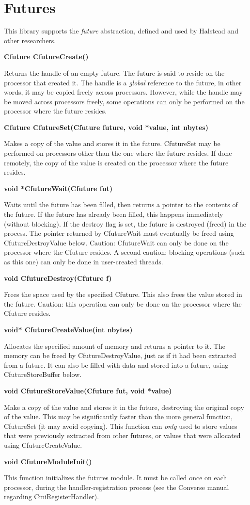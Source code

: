 \chapter{Futures}

This library supports the {\em future} abstraction, defined and used by
Halstead and other researchers.


{\bf Cfuture CfutureCreate()}

Returns the handle of an empty future.  The future is said to reside
on the processor that created it.  The handle is a {\em global}
reference to the future, in other words, it may be copied freely
across processors.  However, while the handle may be moved across
processors freely, some operations can only be performed on the
processor where the future resides.

{\bf Cfuture CfutureSet(Cfuture future, void *value, int nbytes)}

Makes a copy of the value and stores it in the future.  CfutureSet
may be performed on processors other than the one where the future
resides.  If done remotely, the copy of the value is created on the
processor where the future resides.

{\bf void *CfutureWait(Cfuture fut)}

Waits until the future has been filled, then returns a pointer to the
contents of the future.  If the future has already been filled, this
happens immediately (without blocking).  If the destroy flag is set,
the future is destroyed (freed) in the process.  The pointer returned
by CfutureWait must eventually be freed using CfutureDestroyValue
below.  Caution: CfutureWait can only be done on the processor where
the Cfuture resides.  A second caution: blocking operations (such as
this one) can only be done in user-created threads.

{\bf void CfutureDestroy(Cfuture f)}

Frees the space used by the specified Cfuture.  This also frees the
value stored in the future.  Caution: this operation can only be done
on the processor where the Cfuture resides.

{\bf void* CfutureCreateValue(int nbytes)}

Allocates the specified amount of memory and returns a pointer to it.
The memory can be freed by CfutureDestroyValue, just as if it had been
extracted from a future.  It can also be filled with data and stored
into a future, using CfutureStoreBuffer below.

{\bf void CfutureStoreValue(Cfuture fut, void *value)}

Make a copy of the value and stores it in the future, destroying the
original copy of the value.  This may be significantly faster than the
more general function, CfutureSet (it may avoid copying).  This
function can {\em only} used to store values that were previously
extracted from other futures, or values that were allocated using
CfutureCreateValue.

{\bf void CfutureModuleInit()}

This function initializes the futures module.  It must be called once
on each processor, during the handler-registration process (see the
Converse manual regarding CmiRegisterHandler).

